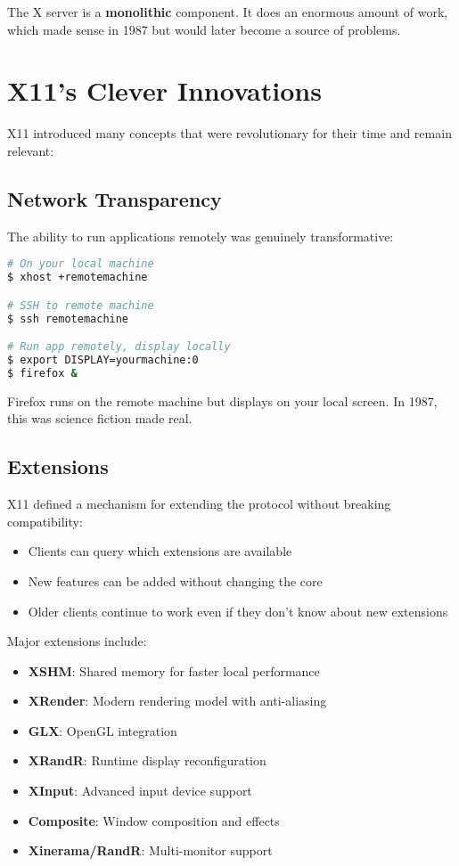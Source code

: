 \begin{importantbox}
The X server is a \textbf{monolithic} component. It does an enormous amount of work, which made sense in 1987 but would later become a source of problems.
\end{importantbox}

\section{X11's Clever Innovations}

X11 introduced many concepts that were revolutionary for their time and remain relevant:

\subsection{Network Transparency}

The ability to run applications remotely was genuinely transformative:

\begin{lstlisting}[language=bash]
# On your local machine
$ xhost +remotemachine

# SSH to remote machine
$ ssh remotemachine

# Run app remotely, display locally
$ export DISPLAY=yourmachine:0
$ firefox &
\end{lstlisting}

Firefox runs on the remote machine but displays on your local screen. In 1987, this was science fiction made real.

\subsection{Extensions}

X11 defined a mechanism for extending the protocol without breaking compatibility:

\begin{itemize}[leftmargin=*]
    \item Clients can query which extensions are available
    \item New features can be added without changing the core
    \item Older clients continue to work even if they don't know about new extensions
\end{itemize}

Major extensions include:
\begin{itemize}[leftmargin=*]
    \item \textbf{XSHM}: Shared memory for faster local performance
    \item \textbf{XRender}: Modern rendering model with anti-aliasing
    \item \textbf{GLX}: OpenGL integration
    \item \textbf{XRandR}: Runtime display reconfiguration
    \item \textbf{XInput}: Advanced input device support
    \item \textbf{Composite}: Window composition and effects
    \item \textbf{Xinerama/RandR}: Multi-monitor support
\end{itemize}

